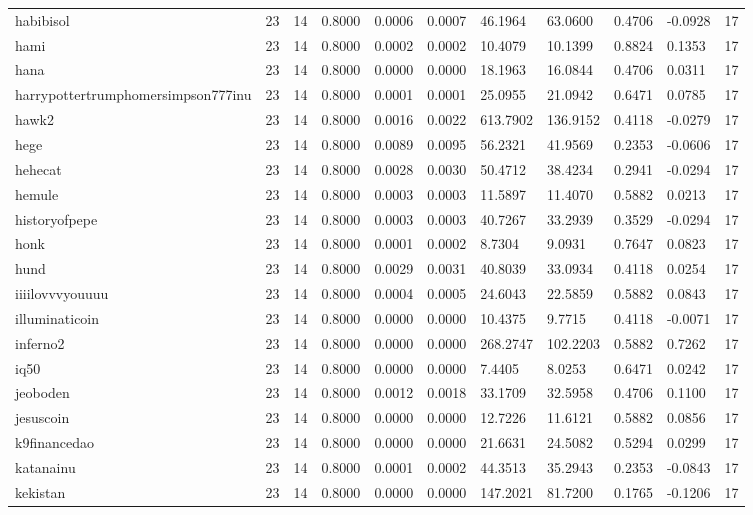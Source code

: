 \begin{table}[htbp]
\begin{tabular}{lllllllllll}
habibisol & 23 & 14 & 0.8000 & 0.0006 & 0.0007 & 46.1964 & 63.0600 & 0.4706 & -0.0928 & 17 \\
hami & 23 & 14 & 0.8000 & 0.0002 & 0.0002 & 10.4079 & 10.1399 & 0.8824 & 0.1353 & 17 \\
hana & 23 & 14 & 0.8000 & 0.0000 & 0.0000 & 18.1963 & 16.0844 & 0.4706 & 0.0311 & 17 \\
harrypottertrumphomersimpson777inu & 23 & 14 & 0.8000 & 0.0001 & 0.0001 & 25.0955 & 21.0942 & 0.6471 & 0.0785 & 17 \\
hawk2 & 23 & 14 & 0.8000 & 0.0016 & 0.0022 & 613.7902 & 136.9152 & 0.4118 & -0.0279 & 17 \\
hege & 23 & 14 & 0.8000 & 0.0089 & 0.0095 & 56.2321 & 41.9569 & 0.2353 & -0.0606 & 17 \\
hehecat & 23 & 14 & 0.8000 & 0.0028 & 0.0030 & 50.4712 & 38.4234 & 0.2941 & -0.0294 & 17 \\
hemule & 23 & 14 & 0.8000 & 0.0003 & 0.0003 & 11.5897 & 11.4070 & 0.5882 & 0.0213 & 17 \\
historyofpepe & 23 & 14 & 0.8000 & 0.0003 & 0.0003 & 40.7267 & 33.2939 & 0.3529 & -0.0294 & 17 \\
honk & 23 & 14 & 0.8000 & 0.0001 & 0.0002 & 8.7304 & 9.0931 & 0.7647 & 0.0823 & 17 \\
hund & 23 & 14 & 0.8000 & 0.0029 & 0.0031 & 40.8039 & 33.0934 & 0.4118 & 0.0254 & 17 \\
iiiilovvvyouuuu & 23 & 14 & 0.8000 & 0.0004 & 0.0005 & 24.6043 & 22.5859 & 0.5882 & 0.0843 & 17 \\
illuminaticoin & 23 & 14 & 0.8000 & 0.0000 & 0.0000 & 10.4375 & 9.7715 & 0.4118 & -0.0071 & 17 \\
inferno2 & 23 & 14 & 0.8000 & 0.0000 & 0.0000 & 268.2747 & 102.2203 & 0.5882 & 0.7262 & 17 \\
iq50 & 23 & 14 & 0.8000 & 0.0000 & 0.0000 & 7.4405 & 8.0253 & 0.6471 & 0.0242 & 17 \\
jeoboden & 23 & 14 & 0.8000 & 0.0012 & 0.0018 & 33.1709 & 32.5958 & 0.4706 & 0.1100 & 17 \\
jesuscoin & 23 & 14 & 0.8000 & 0.0000 & 0.0000 & 12.7226 & 11.6121 & 0.5882 & 0.0856 & 17 \\
k9financedao & 23 & 14 & 0.8000 & 0.0000 & 0.0000 & 21.6631 & 24.5082 & 0.5294 & 0.0299 & 17 \\
katanainu & 23 & 14 & 0.8000 & 0.0001 & 0.0002 & 44.3513 & 35.2943 & 0.2353 & -0.0843 & 17 \\
kekistan & 23 & 14 & 0.8000 & 0.0000 & 0.0000 & 147.2021 & 81.7200 & 0.1765 & -0.1206 & 17 \\

\end{tabular}
\end{table}
